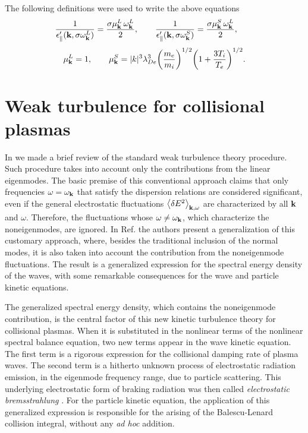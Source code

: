 \documentclass[12pt,a4paper,ruledheader]{report}
\begin{document}
The following definitions were used to write the above equations
\begin{displaymath}
\frac{1}{\epsilon '_\parallel({\bf k},\sigma\omega_{\bf k}^L)}
=\frac{\sigma\mu_{\bf k}^L\,\omega_{\bf k}^L}{2},\qquad
\frac{1}{\epsilon '_\parallel({\bf k},\sigma\omega_{\bf k}^S)}
=\frac{\sigma\mu_{\bf k}^S\,\omega_{\bf k}^L}{2},\qquad
\end{displaymath}
\begin{displaymath}
\mu_{\bf k}^L=1,\qquad
\mu_{\bf k}^S=|k|^3\lambda_{De}^3\biggl(\frac{m_e}{m_i}\biggr)^{1/2}
\biggl(1+\frac{3T_i}{T_e}\biggr)^{1/2}.
\end{displaymath}


\chapter{Weak turbulence for collisional plasmas}
\label{noneigenmode}
In  we made a brief review of the standard weak
turbulence theory procedure. Such procedure takes into account only
the contributions from the linear eigenmodes. The basic premise of this
conventional approach claims that only frequencies $\omega=\omega_{\bf k}$
that satisfy the dispersion relations are considered significant, even if
the general electrostatic fluctuations $\left<\delta E^2\right>_{{\bf k},\omega}$
are characterized by all ${\bf k}$ and $\omega$. Therefore, the fluctuations
whose $\omega \ne \omega_{\bf k}$, which characterize the noneigenmodes,
are ignored. In Ref. \cite{YZKS16} the authors present a generalization
of this customary approach, where, besides the traditional inclusion of
the normal modes, it is also taken into account the contribution from the
noneigenmode fluctuations. The result is a generalized expression for the
spectral energy density of the waves, with some remarkable consequences
for the wave and particle kinetic equations.

The generalized spectral energy density, which contains the noneigenmode
contribution, is the central factor of this new kinetic turbulence theory
for collisional plasmas. When
 it is substituted in the nonlinear terms of
the nonlinear spectral balance equation, two new terms appear in the wave
kinetic equation. The first term is a rigorous expression for the collisional
damping rate of plasma waves. The second term is a hitherto unknown process
of electrostatic radiation emission, in the eigenmode frequency range, due to
particle scattering. This underlying electrostatic form of braking radiation
was then called \emph{electrostatic bremsstrahlung} \cite{YZKS16}. For the
particle kinetic equation, the application of this generalized expression is
responsible for the arising of the Balescu-Lenard collision integral, without
any \emph{ad hoc} addition.
\end{document}
